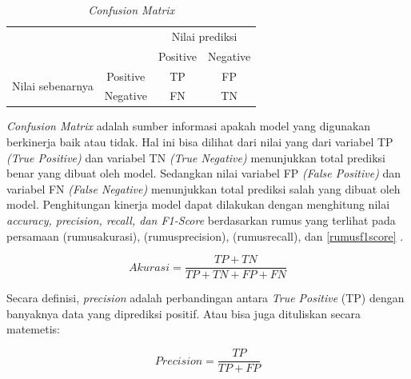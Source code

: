 
\begin{table}[H]
	\center
	\fontsize{10}{12}\selectfont
	\caption{\textit{Confusion Matrix}}
	\label{Precision-recall}
	\begin{tabular}{|lc|cc|}
		\hline
		\multicolumn{2}{|l|}{\multirow{2}{*}{}}                 & \multicolumn{2}{c|}{Nilai prediksi}                                \\ \cline{3-4}
		\multicolumn{2}{|l|}{}                                  & \multicolumn{1}{c|}{Positive}       & Negative                     \\ \hline
		\multicolumn{1}{|l|}{\multirow{2}{*}{Nilai sebenarnya}} & Positive                            & \multicolumn{1}{c|}{TP} & FP \\ \cline{2-4}
		\multicolumn{1}{|l|}{}                                  & Negative                            & \multicolumn{1}{c|}{FN} & TN \\ \hline
	\end{tabular}
\end{table}

\par \textit{Confusion Matrix} adalah sumber informasi apakah model yang digunakan berkinerja baik atau tidak. Hal ini bisa dilihat dari nilai yang dari variabel TP \textit{(True Positive)} dan variabel TN \textit{(True Negative)} menunjukkan total prediksi benar yang dibuat oleh model. Sedangkan nilai variabel FP \textit{(False Positive)} dan variabel FN \textit{(False Negative)} menunjukkan total prediksi salah yang dibuat oleh model. Penghitungan kinerja model dapat dilakukan dengan menghitung nilai \textit{accuracy, precision, recall, dan F1-Score} berdasarkan rumus yang terlihat pada persamaan (rumusakurasi), (rumusprecision), (rumusrecall), dan \ref{rumusf1score} \citep{precisionrecall}.

\begin{equation}
	\label{rumusakurasi}
	Akurasi = \frac{TP+TN}{TP+TN+FP+FN}
\end{equation}
\vspace{0.1cm}

\par Secara definisi, \textit{precision} adalah perbandingan antara \textit{True Positive} (TP) dengan banyaknya data yang diprediksi positif. Atau bisa juga dituliskan secara matemetis:

\begin{equation}
	\label{rumusprecision}
	Precision = \frac{TP}{TP+FP}
\end{equation}
\vspace{0.1cm}

